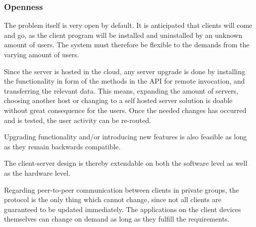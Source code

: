 

\subsubsection{Openness}
The problem itself is very open by default. It is anticipated that clients will come and go, as the client program will be installed and uninstalled by an unknown amount of users. The system must therefore be flexible to the demands from the varying amount of users. 

Since the server is hosted in the cloud, any server upgrade is done by installing the functionality in form of the methods in the API for remote invocation, and transferring the relevant data. This means, expanding the amount of servers, choosing another host or changing to a self hosted server solution is doable without great consequence for the users. Once the needed changes has occurred and is tested, the user activity can be re-routed.

Upgrading functionality and/or introducing new features is also feasible as long as they remain backwards compatible. 




The client-server design is thereby extendable on both the software level as well as the hardware level.

Regarding peer-to-peer communication between clients in private groups, the protocol is the only thing which cannot change, since not all clients are guaranteed to be updated immediately. The applications on the client devices themselves can change on demand as long as they fulfill the requirements.